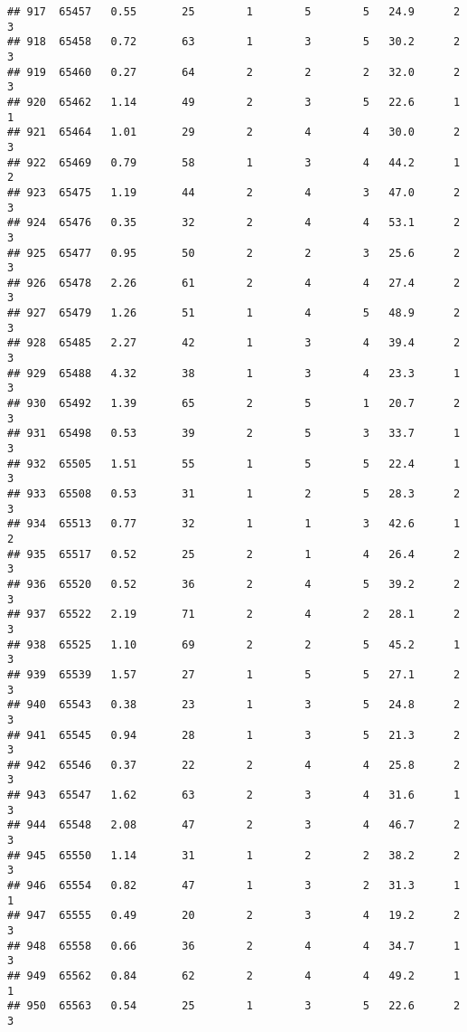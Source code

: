 \documentclass[
]{article}
\begin{document}
\begin{verbatim}
## 917  65457   0.55       25        1        5        5   24.9      2      3
## 918  65458   0.72       63        1        3        5   30.2      2      3
## 919  65460   0.27       64        2        2        2   32.0      2      3
## 920  65462   1.14       49        2        3        5   22.6      1      1
## 921  65464   1.01       29        2        4        4   30.0      2      3
## 922  65469   0.79       58        1        3        4   44.2      1      2
## 923  65475   1.19       44        2        4        3   47.0      2      3
## 924  65476   0.35       32        2        4        4   53.1      2      3
## 925  65477   0.95       50        2        2        3   25.6      2      3
## 926  65478   2.26       61        2        4        4   27.4      2      3
## 927  65479   1.26       51        1        4        5   48.9      2      3
## 928  65485   2.27       42        1        3        4   39.4      2      3
## 929  65488   4.32       38        1        3        4   23.3      1      3
## 930  65492   1.39       65        2        5        1   20.7      2      3
## 931  65498   0.53       39        2        5        3   33.7      1      3
## 932  65505   1.51       55        1        5        5   22.4      1      3
## 933  65508   0.53       31        1        2        5   28.3      2      3
## 934  65513   0.77       32        1        1        3   42.6      1      2
## 935  65517   0.52       25        2        1        4   26.4      2      3
## 936  65520   0.52       36        2        4        5   39.2      2      3
## 937  65522   2.19       71        2        4        2   28.1      2      3
## 938  65525   1.10       69        2        2        5   45.2      1      3
## 939  65539   1.57       27        1        5        5   27.1      2      3
## 940  65543   0.38       23        1        3        5   24.8      2      3
## 941  65545   0.94       28        1        3        5   21.3      2      3
## 942  65546   0.37       22        2        4        4   25.8      2      3
## 943  65547   1.62       63        2        3        4   31.6      1      3
## 944  65548   2.08       47        2        3        4   46.7      2      3
## 945  65550   1.14       31        1        2        2   38.2      2      3
## 946  65554   0.82       47        1        3        2   31.3      1      1
## 947  65555   0.49       20        2        3        4   19.2      2      3
## 948  65558   0.66       36        2        4        4   34.7      1      3
## 949  65562   0.84       62        2        4        4   49.2      1      1
## 950  65563   0.54       25        1        3        5   22.6      2      3

\end{verbatim}
\end{document}
